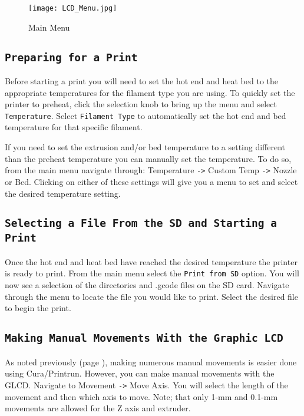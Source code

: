 \begin{figure}[h]
\centering
\texttt{[image: LCD\_Menu.jpg]}
\caption{Main Menu}
\label{fig:main_menu}
\end{figure}

\subsection{\texttt{Preparing for a Print}}
Before starting a print you will need to set the hot end and heat bed to the appropriate temperatures for the filament type you are using. To quickly set the printer to preheat, click the selection knob to bring up the menu and select \texttt{Temperature}. Select \texttt{Filament Type} to automatically set the hot end and bed temperature for that specific filament.

If you need to set the extrusion and/or bed temperature to a setting different than the preheat temperature you can manually set the temperature. To do so, from the main menu navigate through: Temperature \texttt{->} Custom Temp \texttt{->} Nozzle or Bed. Clicking on either of these settings will give you a menu to set and select the desired temperature setting.

\subsection{\texttt{Selecting a File From the SD and Starting a Print}}
Once the hot end and heat bed have reached the desired temperature the printer is ready to print. From the main menu select the \texttt{Print from SD} option. You will now see a selection of the directories and .gcode files on the SD card. Navigate through the menu to locate the file you would like to print. Select the desired file to begin the print.

\subsection{\texttt{Making Manual Movements With the Graphic LCD}}
As noted previously (page \pageref{sec:Graphic LCD, Cura or Printrun Host?}), making numerous manual movements is easier done using Cura/Printrun. However, you can make manual movements with the GLCD. Navigate to Movement \texttt{->} Move Axis. You will select the length of the movement and then which axis to move. Note; that only 1-mm and 0.1-mm movements are allowed for the Z axis and extruder.

